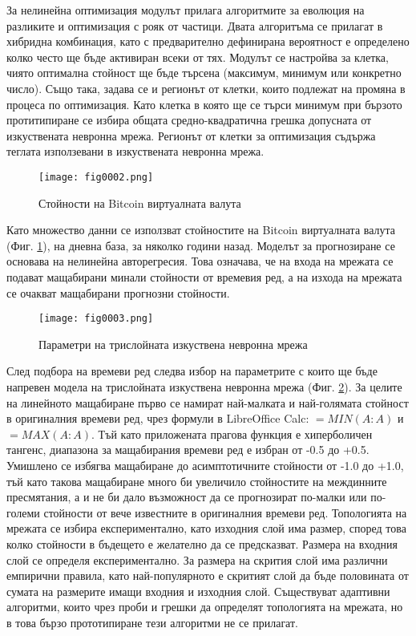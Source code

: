 За нелинейна оптимизация модулът прилага алгоритмите за еволюция на разликите и оптимизация с рояк от частици. Двата алгоритъма се прилагат в хибридна комбинация, като с предварително дефинирана вероятност е определено колко често ще бъде активиран всеки от тях. Модулът се настройва за клетка, чиято оптимална стойност ще бъде търсена (максимум, минимум или конкретно число). Също така, задава се и регионът от клетки, които подлежат на промяна в процеса по оптимизация. Като клетка в която ще се търси минимум при бързото протитипиране се избира общата средно-квадратична грешка допусната от изкуствената невронна мрежа. Регионът от клетки за оптимизация съдържа теглата използевани в изкуствената невронна мрежа. 

\begin{figure}[H]
  \centering
  \texttt{[image: fig0002.png]}
  \caption{Стойности на Bitcoin виртуалната валута}
\label{fig002}
\end{figure}

Като множество данни се използват стойностите на Bitcoin виртуалната валута (Фиг. \ref{fig002}), на дневна база, за няколко години назад. Моделът за прогнозиране се основава на нелинейна авторегресия. Това означава, че на входа на мрежата се подават мащабирани минали стойности от времевия ред, а на изхода на мрежата се очакват мащабирани прогнозни стойности. 

\begin{figure}[H]
  \centering
  \texttt{[image: fig0003.png]}
  \caption{Параметри на трислойната изкуствена невронна мрежа}
\label{fig003}
\end{figure}

След подбора на времеви ред следва избор на параметрите с които ще бъде напревен модела на трислойната изкуствена невронна мрежа (Фиг. \ref{fig003}). За целите на линейното мащабиране първо се намират най-малката и най-голямата стойност в оригиналния времеви ред, чрез формули в LibreOffice Calc: $=MIN(A:A)$ и $=MAX(A:A)$. Тъй като приложената прагова функция е хиперболичен тангенс, диапазона за мащабирания времеви ред е избран от -0.5 до +0.5. Умишлено се избягва мащабиране до асимптотичните стойности от -1.0 до +1.0, тъй като такова мащабиране много би увеличило стойностите на междинните пресмятания, а и не би дало възможност да се прогнозират по-малки или по-големи стойности от вече известните в оригиналния времеви ред. Топологията на мрежата се избира експериментално, като изходния слой има размер, според това колко стойности в бъдещето е желателно да се предсказват. Размера на входния слой се определя експериментално. За размера на скрития слой има различни емпирични правила, като най-популярното е скритият слой да бъде половината от сумата на размерите имащи входния и изходния слой. Съществуват адаптивни алгоритми, които чрез проби и грешки да определят топологията на мрежата, но в това бързо прототипиране тези алгоритми не се прилагат. 

